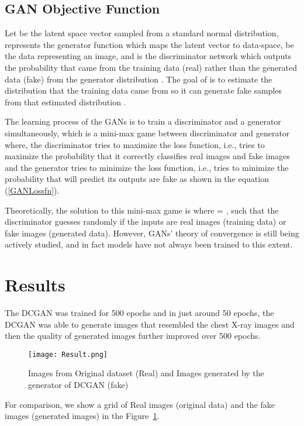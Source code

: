 \documentclass{article}
\begin{document}
\subsection*{GAN Objective Function}
Let  be the latent space vector sampled from a standard normal distribution,  represents the generator function which maps the latent vector  to data-space,  be the data representing an image, and  is the discriminator network which outputs the probability that  came from the training data (real) rather than the generated data (fake) from the generator distribution . 
The goal of  is to estimate the distribution that the training data came from  so it can generate fake samples from that estimated distribution  \cite{goodfellow2014generative}. 
\par
The learning process of the GANs is to train a discriminator and a generator simultaneously, which is a mini-max game between discriminator and generator where, the discriminator tries to maximize the loss function, i.e.,  tries to maximize the probability that it correctly classifies real images and fake images  and the generator tries to minimize the loss function, i.e.,  tries to minimize the probability that  will predict its outputs are fake   as shown in the equation (\ref{GANLossfn}). 



Theoretically, the solution to this mini-max game is where  = , such that the discriminator guesses randomly if the inputs are real images (training data) or fake images (generated data). However, GANs' theory of convergence is still being actively studied, and in fact models have not always been trained to this extent.





\section*{Results}

The DCGAN was trained for 500 epochs and in just around 50 epochs, the DCGAN was able to generate images that resembled the chest X-ray images and then the quality of generated images further improved over 500 epochs. 
\begin{figure}[htbp]
\centering
\texttt{[image: Result.png]}
\caption{Images from Original dataset (Real) and Images generated by the generator of DCGAN (fake)}
\label{fig:Result}
\end{figure}
For comparison, we show a grid of Real images (original data) and the fake images (generated images) in the Figure~\ref{fig:Result}.
\end{document}
